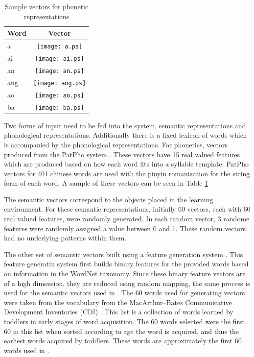 \documentclass[a4paper,11pt]{article}
\begin{document}
\begin{center}
  \begin{table}
    \begin{tabular}[t] { | l | c | }
      \hline
      Word & Vector \\
      \hline
      a &  \texttt{[image: a.ps]} \\
      ai &  \texttt{[image: ai.ps]} \\
      an & \texttt{[image: an.ps]} \\ 
      ang & \texttt{[image: ang.ps]} \\ 
      ao & \texttt{[image: ao.ps]} \\
      ba & \texttt{[image: ba.ps]} \\
      \hline
    \end{tabular}
    \caption{Sample vectors for phonetic representations}
    \label{tb:phono}
  \end{table}
\end{center}

Two forms of input need to be fed into the system, semantic representations and
phonological representations.  Additionally there is a fixed lexicon of words
which is accompanied by the phonological representations.  For phonetics,
vectors produced from the PatPho system \cite{LiPatPho}.  These vectors have 15
real valued features which are produced based on how each word fits into a
syllable template.  PatPho vectors for 401 chinese words are used with the
pinyin romanization for the string form of each word.  A sample of these vectors
can be seen in Table \ref{tb:phono}

The semantic vectors correspond to the objects placed in the learning environment.
For these semantic representations, initially 60 vectors, each with 60 real valued
features, were randomly generated.  In each random vector, 3 randome features were
randomly assigned a value between 0 and 1.  These random vectors had no underlying
patterns within them.

The other set of semantic vectors built using a feature generation system
\cite{HarmWordNetFeature}.  This feature generatin system first builds binary
features for the provided words based on information in the WordNet taxonomy.
Since these binary feature vectors are of a high dimension, they are reduced
using random mapping, the same process is used for the semantic vectors used in
\cite{LiDevLex}.  The 60 words used for generating vectors were taken from the
vocabulary from the MacArthur–Bates Communicative Development Inventories (CDI) \cite{DaleCDI}.
This list is a collection of words learned by toddlers in early stages of word
acquisition.  The 60 words selected were the first 60 in this list when sorted
according to age the word is acquired, and thus the earliest words acquired by
toddlers.  These words are approximately the first 60 words used in \cite{LiDevLex}.
\end{document}
